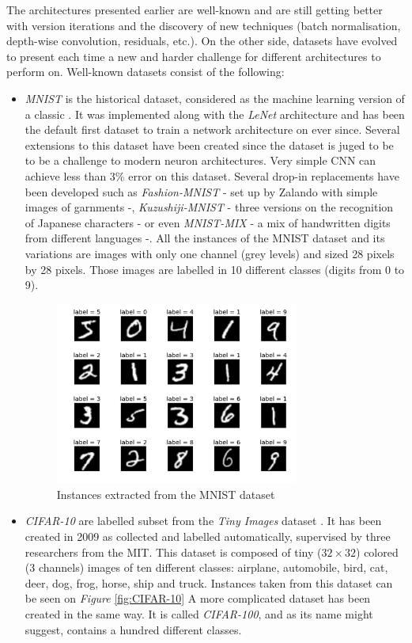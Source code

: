 The architectures presented earlier are well-known and are still getting better with version iterations and the discovery of new techniques (batch normalisation, depth-wise convolution, residuals, etc.). On the other side, datasets have evolved to present each time a new and harder challenge for different architectures to perform on. Well-known datasets consist of the following:
\begin{itemize}
  \item \emph{MNIST} is the historical dataset, considered as the machine learning version of a classic . It was implemented along with the \emph{LeNet} architecture and has been the default first dataset to train a network architecture on ever since. Several extensions to this dataset have been created since the dataset is juged to be  to be a challenge to modern neuron architectures. Very simple CNN can achieve less than 3\% error on this dataset. Several drop-in replacements have been developed such as \emph{Fashion-MNIST} \cite{Xiao2017} - set up by Zalando with simple images of garnments -, \emph{Kuzushiji-MNIST} \cite{Clanuwat2018} - three versions on the recognition of Japanese characters - or even \emph{MNIST-MIX} \cite{Jiang2020} - a mix of handwritten digits from different languages -. All the instances of the MNIST dataset and its variations are images with only one channel (grey levels) and sized 28 pixels by 28 pixels. Those images are labelled in 10 different classes (digits from 0 to 9).

  \begin{figure}[htbp]
  	\centering
  		\includegraphics[width=8cm]{Figures/MNIST.png}
  	\caption[MNIST]{Instances extracted from the MNIST dataset}
  	\label{fig:MNIST}
  \end{figure}

  \item \emph{CIFAR-10} are labelled subset from the \emph{Tiny Images} dataset \cite{Krizhevsky2009}. It has been created in 2009 as collected and labelled automatically, supervised by three researchers from the MIT. This dataset is composed of tiny ($32 \times 32$) colored (3 channels) images of ten different classes: airplane, automobile, bird, cat, deer, dog, frog, horse, ship and truck. Instances taken from this dataset can be seen on \emph{Figure} \ref{fig:CIFAR-10} A more complicated dataset has been created in the same way. It is called \emph{CIFAR-100}, and as its name might suggest, contains a hundred different classes.


\end{itemize}
